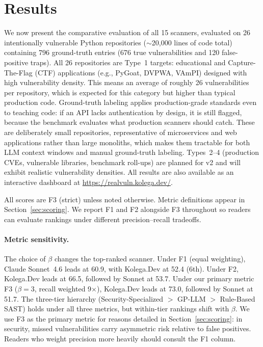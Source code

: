 \section{Results}
\label{sec:results}

We now present the comparative evaluation of all 15 scanners, evaluated on 26 intentionally vulnerable Python repositories (${\sim}$20{,}000 lines of code total) containing 796 ground-truth entries (676 true vulnerabilities and 120 false-positive traps). All 26 repositories are Type~1 targets: educational and Capture-The-Flag (CTF) applications (e.g., PyGoat, DVPWA, VAmPI) designed with high vulnerability density. This means an average of roughly 26 vulnerabilities per repository, which is expected for this category but higher than typical production code. Ground-truth labeling applies production-grade standards even to teaching code: if an API lacks authentication by design, it is still flagged, because the benchmark evaluates what production scanners should catch. These are deliberately small repositories, representative of microservices and web applications rather than large monoliths, which makes them tractable for both LLM context windows and manual ground-truth labeling. Types~2--4 (production CVEs, vulnerable libraries, benchmark roll-ups) are planned for v2 and will exhibit realistic vulnerability densities. All results are also available as an interactive dashboard at \url{https://realvuln.kolega.dev/}.

All scores are F3 (strict) unless noted otherwise. Metric definitions appear in Section~\ref{sec:scoring}. We report F1 and F2 alongside F3 throughout so readers can evaluate rankings under different precision--recall tradeoffs.

\paragraph{Metric sensitivity.} The choice of $\beta$ changes the top-ranked scanner. Under F1 (equal weighting), Claude Sonnet~4.6 leads at 60.9, with Kolega.Dev at 52.4 (6th). Under F2, Kolega.Dev leads at 66.5, followed by Sonnet at 53.7. Under our primary metric F3 ($\beta{=}3$, recall weighted 9$\times$), Kolega.Dev leads at 73.0, followed by Sonnet at 51.7. The three-tier hierarchy (Security-Specialized $>$ GP-LLM $>$ Rule-Based SAST) holds under all three metrics, but within-tier rankings shift with $\beta$. We use F3 as the primary metric for reasons detailed in Section~\ref{sec:scoring}: in security, missed vulnerabilities carry asymmetric risk relative to false positives. Readers who weight precision more heavily should consult the F1 column.

